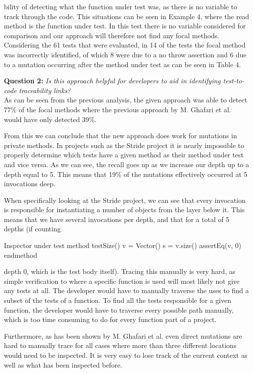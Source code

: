 \documentclass[11pt]{article}
\begin{document}
\begin{multicols}{2}
\noindent
bility of detecting what the function under test was, as there is no variable to track through the code. This situations can be seen in Example 4, where the read method is the function under test. In this test there is no variable considered for comparison and our approach will therefore not find any focal methods. Considering the 61 tests that were evaluated, in 14 of the tests the focal method was incorrectly identified, of which 8 were due to a no throw assertion and 6 due to a mutation occurring after the method under test as can be seen in Table 4.

\noindent
\textbf{Question 2:} \textit{Is this approach helpful for developers to aid in identifying test-to-code traceability links?}\\
As can be seen from the previous analysis, the given approach was able to detect 77\% of the focal methods where the previous approach by M. Ghafari et al. \cite{ghafari2015automatically} would have only detected 39\%. 

From this we can conclude that the new approach does work for mutations in private methods. In projects such as the Stride project it is nearly impossible to properly determine which tests have a given method as their method under test and vice versa. As we can see, the recall goes up as we increase our depth up to a depth equal to 5. This means that 19\% of the mutations effectively occurred at 5 invocations deep. 

When specifically looking at the Stride project, we can see that every invocation is responsible for instantiating a number of objects from the layer below it. This means that we have several invocations per depth, and that for a total of 5 depths (if counting 

\begin{sexylisting}{Inspector under test}
method testSize()
  v = Vector()
  s = v.size()
  assertEq(v, 0)
endmethod 
\end{sexylisting}
\noindent
depth 0, which is the test body itself). Tracing this manually is very hard, as simple verification to where a specific function is used will most likely not give any tests at all. The developer would have to manually traverse the uses to find a subset of the tests of a function. To find all the tests responsible for a given function, the developer would have to traverse every possible path manually, which is too time consuming to do for every function part of a project.

Furthermore, as has been shown by M. Ghafari et al.\cite{ghafari2015automatically} even direct mutations are hard to manually trace for all cases where more than three different locations would need to be inspected. It is very easy to lose track of the current context as well as what has been inspected before. 


\end{multicols}
\end{document}
